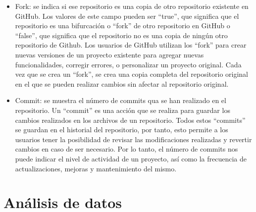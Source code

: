 \documentclass[a4paper, 12pt]{book}
\begin{document}
\begin{itemize}
  \item Fork: se indica si ese repositorio es una copia de otro repositorio existente en GitHub. 
  Los valores de este campo pueden ser ``true'', que significa que el repositorio es una bifurcación o ``fork'' de otro repositorio en GitHub o ``false'', que significa que el repositorio no es una copia de ningún otro repositorio de Github.
  Los usuarios de GitHub utilizan los ``fork'' para crear nuevas versiones de un proyecto existente para agregar nuevas funcionalidades, corregir errores, o personalizar un proyecto original.
  Cada vez que se crea un ``fork'', se crea una copia completa del repositorio original en el que se pueden realizar cambios sin afectar al repositorio original.
  
  \item Commit: se muestra el número de commits qua se han realizado en el repositorio.
  Un ``commit'' es una acción que se realiza para guardar los cambios realizados en los archivos de un repositorio.
  Todos estos ``commits'' se guardan en el historial del repositorio, por tanto, esto permite a los usuarios tener la posibilidad de revisar las modificaciones realizadas y revertir cambios en caso de ser necesario. 
  Por lo tanto, el número de commits nos puede indicar el nivel de actividad de un proyecto, así como la frecuencia de actualizaciones, mejoras y mantenimiento del mismo.
  
\end{itemize} 

\section{Análisis de datos} %
\label{sec:análisis de datos}

\end{document}
